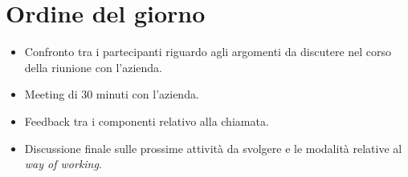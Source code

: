 \section{Ordine del giorno}
\begin{itemize}
    \item Confronto tra i partecipanti riguardo agli argomenti da discutere nel 
		corso della riunione con l'azienda.
    \item Meeting di 30 minuti con l'azienda.
    \item Feedback tra i componenti relativo alla chiamata.
    \item Discussione finale sulle prossime attività da svolgere e le modalità 
		relative al \textit{way of working}.
\end{itemize}
